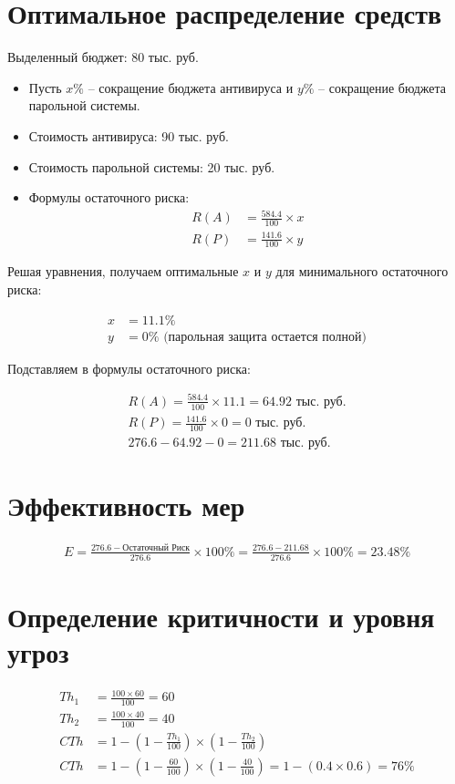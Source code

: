 \documentclass{bsuir}
\begin{document}
\section{Оптимальное распределение средств}

Выделенный бюджет: 80 тыс. руб.

\begin{itemize}
    \item Пусть $x\%$ -- сокращение бюджета антивируса и $y\%$ -- сокращение бюджета парольной системы.
    \item Стоимость антивируса: 90 тыс. руб.
    \item Стоимость парольной системы: 20 тыс. руб.
    \item Формулы остаточного риска:
    \begin{align*}
    R(A) &= \frac{584.4}{100} \times x \\
    R(P) &= \frac{141.6}{100} \times y
    \end{align*}
\end{itemize}

Решая уравнения, получаем оптимальные $x$ и $y$ для минимального остаточного риска:

\begin{align*}
x &= 11.1\% \\
y &= 0\% \text{ (парольная защита остается полной)}
\end{align*}

Подставляем в формулы остаточного риска:

\begin{align*}
R(A) = \frac{584.4}{100} \times 11.1 = 64.92 \text{ тыс. руб.} \\
R(P) = \frac{141.6}{100} \times 0 = 0 \text{ тыс. руб.}\\
276.6 - 64.92 - 0 = 211.68 \text{ тыс. руб.}
\end{align*}

\section{Эффективность мер}

\begin{align*}
E = \frac{276.6 - \text{Остаточный Риск}}{276.6} \times 100\%
= \frac{276.6 - 211.68}{276.6} \times 100\% = 23.48\%
\end{align*}

\section{Определение критичности и уровня угроз}

\begin{align*}
Th_1 &= \frac{100 \times 60}{100} = 60 \\
Th_2 &= \frac{100 \times 40}{100} = 40 \\
CTh &= 1 - (1 - \frac{Th_1}{100}) \times (1 - \frac{Th_2}{100}) \\
CTh &= 1 - (1 - \frac{60}{100}) \times (1 - \frac{40}{100})
= 1 - (0.4 \times 0.6)
= 76\%
\end{align*}
\end{document}
